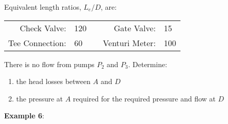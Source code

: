 \documentclass[10pt, oneside]{amsart}
\begin{document}
Equivalent length ratios, $L_e/D$, are:
\begin{tabular}{rlcrl}
	Check Valve:    & 120 &   & Gate Valve:    & 15  \\
	Tee Connection: & 60  &   & Venturi Meter: & 100 
\end{tabular}

\par\medskip
There is no flow from pumps $P_2$ and $P_3$. Determine:
\begin{enumerate}
	\item the head losses between $A$ and $D$
	\item the pressure at $A$ required for the required pressure and flow at $D$
\end{enumerate}



\vfill
\pagebreak


\textbf{Example 6}:
\end{document}
